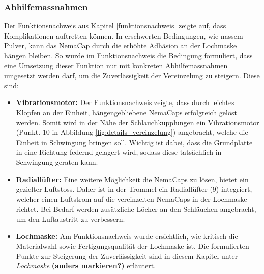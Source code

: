 \subsubsection{Abhilfemassnahmen}
Der Funktionsnachweis aus Kapitel \ref{funktionsnachweis} zeigte auf, dass Komplikationen auftretten können. In erschwerten Bedingungen, wie nassem Pulver, kann das NemaCap  durch die erhöhte Adhäsion an der Lochmaske hängen bleiben. So wurde im Funktionsnachweis die Bedingung formuliert, dass eine Umsetzung dieser Funktion nur mit konkreten Abhilfemassnahmen umgesetzt werden darf, um die Zuverlässigkeit der Vereinzelung zu steigern. Diese sind:
\begin{itemize}
	\item \textbf{Vibrationsmotor:} Der Funktionsnachweis zeigte, dass durch leichtes Klopfen an der Einheit, hängengebliebene NemaCaps erfolgreich gelöst werden. Somit wird in der Nähe der Schlauchkupplungen ein Vibrationsmotor (Punkt. 10 in Abbildung \ref{fig:details_vereinzelung}) angebracht, welche die Einheit in Schwingung bringen soll. Wichtig ist dabei, dass die Grundplatte in eine Richtung federnd gelagert wird, sodass diese tatsächlich in Schwingung geraten kann.
	
	\item \textbf{Radiallüfter:} Eine weitere Möglichkeit die NemaCaps zu lösen, bietet ein gezielter Luftstoss. Daher ist in der Trommel ein Radiallüfter (9) integriert, welcher einen Luftstrom auf die vereinzelten NemaCaps in der Lochmaske richtet. Bei Bedarf werden zusätzliche Löcher an den Schläuchen angebracht, um den Luftaustritt zu verbessern. 
	
	\item \textbf{Lochmaske:} Am Funktionsnachweis wurde ersichtlich, wie kritisch die Materialwahl sowie Fertigungsqualität der Lochmaske ist. Die formulierten Punkte zur Steigerung der Zuverlässigkeit sind in diesem Kapitel unter \textit{Lochmaske} \textbf{(anders markieren?)} erläutert.
\end{itemize}


